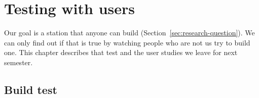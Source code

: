 \chapter{Testing with users}\label{ch:user-testing}


Our goal is a station that anyone can build (Section~\ref{sec:research-question}). We can only
find out if that is true by watching people who are not us try to build one. This chapter
describes that test and the user studies we leave for next semester.

\section{Build test}\label{sec:build-test}


